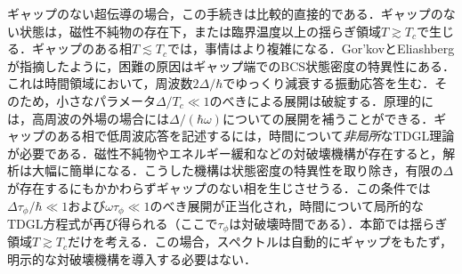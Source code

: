 \documentclass[a4paper,11pt]{ltjsarticle}
\begin{document}
ギャップのない超伝導の場合，この手続きは比較的直接的である．ギャップのない状態は，磁性不純物の存在下，または臨界温度以上の揺らぎ領域$T\gtrsim T_{c}$で生じる．ギャップのある相$T\lesssim T_{c}$では，事情はより複雑になる．Gor'kovとEliashberg\cite{Gor'kovEliashberg}が指摘したように，困難の原因はギャップ端でのBCS状態密度の特異性にある．これは時間領域において，周波数$2\Delta/\hbar$でゆっくり減衰する振動応答を生む．そのため，小さなパラメータ$\Delta/T_{c}\ll 1$のべきによる展開は破綻する．原理的には，高周波の外場の場合には$\Delta/(\hbar\omega)$についての展開を補うことができる．ギャップのある相で低周波応答を記述するには，時間について\textit{非局所}なTDGL理論が必要である．磁性不純物やエネルギー緩和などの対破壊機構が存在すると，解析は大幅に簡単になる．こうした機構は状態密度の特異性を取り除き，有限の$\Delta$が存在するにもかかわらずギャップのない相を生じさせうる．この条件では$\Delta\tau_{\phi}/\hbar\ll 1$および$\omega\tau_{\phi}\ll 1$のべき展開が正当化され，時間について局所的なTDGL方程式が再び得られる（ここで$\tau_{\phi}$は対破壊時間である）．本節では揺らぎ領域$T\gtrsim T_c$だけを考える．この場合，スペクトルは自動的にギャップをもたず，明示的な対破壊機構を導入する必要はない．
\end{document}
